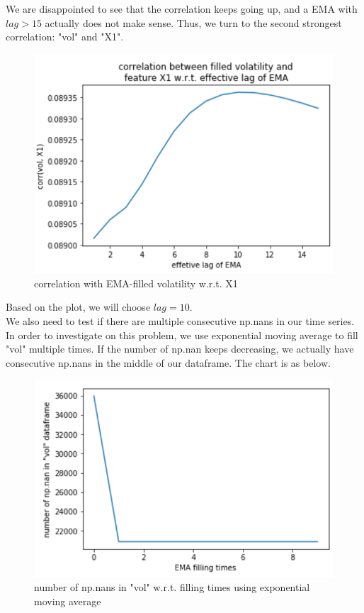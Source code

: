\documentclass[onecolumn]{article}
\begin{document}
\noindent We are disappointed to see that the correlation keeps going up, and a EMA with  $lag>15$ actually does not make sense. Thus, we turn to the second strongest correlation: "vol" and "X1".

\begin{figure}[ht]
\centering
\includegraphics[scale=0.6]{corr_vol_x1.PNG}
\caption{correlation with EMA-filled volatility w.r.t. X1}
\label{fig:label}
\end{figure}

\noindent Based on the plot, we will choose $lag=10$.\\
\indent We also need to test if there are multiple consecutive np.nans in our time series. In order to investigate on this problem, we use exponential moving average to fill "vol" multiple times. If the number of np.nan keeps decreasing, we actually have consecutive np.nans in the middle of our dataframe. The chart is as below.

\begin{figure}[ht]
\centering
\includegraphics[scale=0.6]{multiple_fill_nan_num.PNG}
\caption{number of np.nans in "vol" w.r.t. filling times using exponential moving average}
\label{fig:label}
\end{figure}
\end{document}
